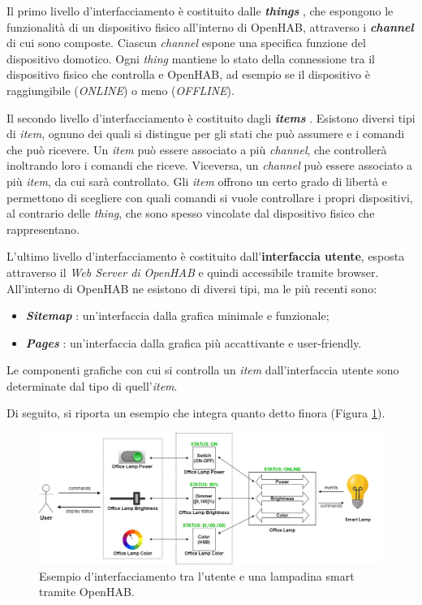 Il primo livello d'interfacciamento è costituito dalle \textit{\textbf{things}}
\cite{THINGS}, che espongono le funzionalità di un dispositivo fisico
all’interno di OpenHAB, attraverso i \textit{\textbf{channel}} di cui sono
composte. Ciascun \textit{channel} espone una specifica funzione del
dispositivo domotico. Ogni \textit{thing} mantiene lo stato della connessione
tra il dispositivo fisico che controlla e OpenHAB, ad esempio se il dispositivo
è raggiungibile (\textit{ONLINE}) o meno (\textit{OFFLINE}).

Il secondo livello d'interfacciamento è costituito dagli
\textit{\textbf{items}} \cite{ITEMS}. Esistono diversi tipi di \textit{item},
ognuno dei quali si distingue per gli stati che può assumere e i comandi che
può ricevere. Un \textit{item} può essere associato a più \textit{channel}, che
controllerà inoltrando loro i comandi che riceve. Viceversa, un
\textit{channel} può essere associato a più \textit{item}, da cui sarà
controllato. Gli \textit{item} offrono un certo grado di libertà e permettono
di scegliere con quali comandi si vuole controllare i propri dispositivi, al
contrario delle \textit{thing}, che sono spesso vincolate dal dispositivo
fisico che rappresentano.

L’ultimo livello d'interfacciamento è costituito dall'\textbf{interfaccia
utente}, esposta attraverso il \textit{Web Server di OpenHAB} e quindi
accessibile tramite browser. All’interno di OpenHAB ne esistono di diversi
tipi, ma le più recenti sono:
\begin{itemize}
  \item \textit{\textbf{Sitemap}} \cite{SITEMAP}: un’interfaccia dalla grafica
        minimale e funzionale;
  \item \textit{\textbf{Pages}} \cite{PAGES}: un’interfaccia dalla grafica più
        accattivante e user-friendly.
\end{itemize}
Le componenti grafiche con cui si controlla un \textit{item} dall’interfaccia
utente sono determinate dal tipo di quell’\textit{item}.

Di seguito, si riporta un esempio che integra quanto detto finora (Figura
\ref{fig:figure3.4}).
\begin{figure}[!ht]
  \centering
  \includegraphics[scale=0.36]{resources/images/other/openhab-lamp-example.jpg}
  \caption{
    Esempio d'interfacciamento tra l'utente e una lampadina smart tramite
    OpenHAB.
  }
  \label{fig:figure3.4}
\end{figure}

